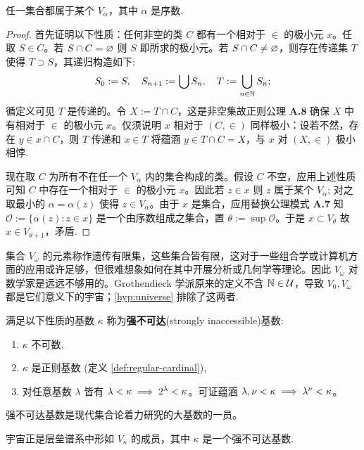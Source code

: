 \begin{proposition}
	任一集合都属于某个 $V_\alpha$，其中 $\alpha$ 是序数.
\end{proposition}
\begin{proof}
	首先证明以下性质：任何非空的类 $C$ 都有一个相对于 $\in$ 的极小元 $x$。任取 $S \in C$。若 $S \cap C = \varnothing$ 则 $S$ 即所求的极小元。若 $S \cap C \neq \varnothing$，则存在传递集 $T$ 使得 $T \supset S$，其递归构造如下:
	\[ S_0 := S,\quad S_{n+1} := \bigcup S_n,\quad T := \bigcup_{n \in \mathbb{N}} S_n; \]
	循定义可见 $T$ 是传递的。令 $X := T \cap C$，这是非空集故正则公理 \textbf{A.8} 确保 $X$ 中有相对于 $\in$ 的极小元 $x$。仅须说明 $x$ 相对于 $(C,\in)$ 同样极小：设若不然，存在 $y \in x \cap C$，则 $T$ 传递和 $x \in T$ 将蕴涵 $y \in T \cap C = X$，与 $x$ 对 $(X,\in)$ 极小相悖.

	现在取 $C$ 为所有不在任一个 $V_\alpha$ 内的集合构成的类。假设 $C$ 不空，应用上述性质可知 $C$ 中存在一个相对于 $\in$ 的极小元 $x$。因此若 $z \in x$ 则 $z$ 属于某个 $V_\alpha$; 对之取最小的 $\alpha = \alpha(z)$ 使得 $z \in V_\alpha$。由于 $x$ 是集合，应用替换公理模式 \textbf{A.7} 知 $\mathcal{O} := \{\alpha(z) : z \in x \}$ 是一个由序数组成之集合，置 $\theta := \sup \mathcal{O}$。于是 $x \subset V_\theta$ 故 $x \in V_{\theta+1}$，矛盾.
\end{proof}

集合 $V_\omega$ 的元素称作遗传有限集，这些集合皆有限，这对于一些组合学或计算机方面的应用或许足够，但很难想象如何在其中开展分析或几何学等理论。因此 $V_\omega$ 对数学家是远远不够用的。Grothendieck 学派原来的定义不含 $\mathbb{N} \in \mathcal{U}$，导致 $V_0, V_\omega$ 都是它们意义下的宇宙；\ref{hyp:universe} 排除了这两者.

\begin{definition}
	满足以下性质的基数 $\kappa$ 称为\textbf{强不可达}(strongly inaccessible)基数:
	\begin{enumerate}[\bfseries {I}.1]
		\item $\kappa$ 不可数,
		\item $\kappa$ 是正则基数 (定义 \ref{def:regular-cardinal}),
		\item 对任意基数 $\lambda$ 皆有 $\lambda < \kappa \implies 2^\lambda < \kappa$。可证蕴涵 $\lambda,\nu < \kappa \implies \lambda^\nu < \kappa$。
	\end{enumerate}
\end{definition}
强不可达基数是现代集合论着力研究的大基数的一员。
\begin{theorem}[Bourbaki]
	宇宙正是层垒谱系中形如 $V_\kappa$ 的成员，其中 $\kappa$ 是一个强不可达基数.
\end{theorem}

